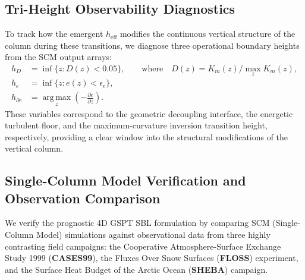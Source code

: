 \documentclass[11pt,letterpaper]{article}
\begin{document}
\subsection{Tri-Height Observability Diagnostics}
\label{subsec:triheight_observability}

To track how the emergent $h_{\text{eff}}$ modifies the continuous vertical structure of the column during these transitions, we diagnose three operational boundary heights from the SCM output arrays:
\begin{equation}
\begin{aligned}
h_D &= \inf\{z : D(z) < 0.05\}, \qquad \text{where} \quad D(z)=K_m(z)/\max_z K_m(z),\\
h_e &= \inf\{z : e(z) < \epsilon_e\},\\
h_{\partial e} &= \operatorname*{arg\,max}_z\left(-\frac{\partial e}{\partial z}\right).
\end{aligned}
\label{eq:triheight_diagnostics}
\end{equation}
These variables correspond to the geometric decoupling interface, the energetic turbulent floor, and the maximum-curvature inversion transition height, respectively, providing a clear window into the structural modifications of the vertical column.

\subsection{Single-Column Model Verification and Observation Comparison}
\label{subsec:numerical_verification}

We verify the prognostic 4D GSPT SBL formulation by comparing SCM (Single-Column Model) simulations against observational data from three highly contrasting field campaigns: the Cooperative Atmosphere-Surface Exchange Study 1999 (\textbf{CASES99}), the Fluxes Over Snow Surfaces (\textbf{FLOSS}) experiment, and the Surface Heat Budget of the Arctic Ocean (\textbf{SHEBA}) campaign.
\end{document}
